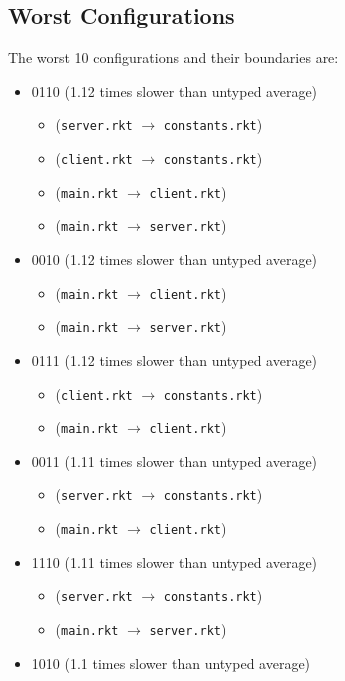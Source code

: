 \documentclass{article}
\newcommand{\mono}[1]{\texttt{#1}}
\begin{document}
\subsection{Worst Configurations}
The worst 10 configurations and their boundaries are:
\begin{itemize}
\item 0110 (1.12 times slower than untyped average)
  \begin{itemize}
  \item (\mono{server.rkt} $\rightarrow$ \mono{constants.rkt})
  \item (\mono{client.rkt} $\rightarrow$ \mono{constants.rkt})
  \item (\mono{main.rkt} $\rightarrow$ \mono{client.rkt})
  \item (\mono{main.rkt} $\rightarrow$ \mono{server.rkt})
  \end{itemize}
\item 0010 (1.12 times slower than untyped average)
  \begin{itemize}
  \item (\mono{main.rkt} $\rightarrow$ \mono{client.rkt})
  \item (\mono{main.rkt} $\rightarrow$ \mono{server.rkt})
  \end{itemize}
\item 0111 (1.12 times slower than untyped average)
  \begin{itemize}
  \item (\mono{client.rkt} $\rightarrow$ \mono{constants.rkt})
  \item (\mono{main.rkt} $\rightarrow$ \mono{client.rkt})
  \end{itemize}
\item 0011 (1.11 times slower than untyped average)
  \begin{itemize}
  \item (\mono{server.rkt} $\rightarrow$ \mono{constants.rkt})
  \item (\mono{main.rkt} $\rightarrow$ \mono{client.rkt})
  \end{itemize}
\item 1110 (1.11 times slower than untyped average)
  \begin{itemize}
  \item (\mono{server.rkt} $\rightarrow$ \mono{constants.rkt})
  \item (\mono{main.rkt} $\rightarrow$ \mono{server.rkt})
  \end{itemize}
\item 1010 (1.1 times slower than untyped average)

\end{itemize}
\end{document}
